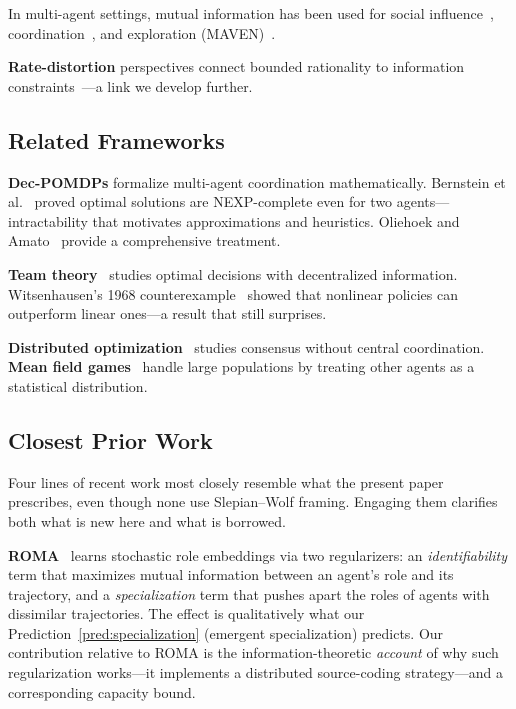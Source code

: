 \documentclass[10pt, letterpaper]{article}
\begin{document}
In multi-agent settings, mutual information has been used for social influence~\cite{jaques2019social}, coordination~\cite{wang2020roma}, and exploration (MAVEN)~\cite{mahajan2019maven}.

\textbf{Rate-distortion} perspectives connect bounded rationality to information constraints~\cite{ortega2013,genewein2015}---a link we develop further.

\subsection{Related Frameworks}

\textbf{Dec-POMDPs} formalize multi-agent coordination mathematically. Bernstein et al.~\cite{bernstein2002} proved optimal solutions are NEXP-complete even for two agents---intractability that motivates approximations and heuristics. Oliehoek and Amato~\cite{oliehoek2016} provide a comprehensive treatment.

\textbf{Team theory}~\cite{marschak1972} studies optimal decisions with decentralized information. Witsenhausen's 1968 counterexample~\cite{witsenhausen1968} showed that nonlinear policies can outperform linear ones---a result that still surprises.

\textbf{Distributed optimization}~\cite{boyd2011admm,nedic2009distributed} studies consensus without central coordination. \textbf{Mean field games}~\cite{huang2006meanfield} handle large populations by treating other agents as a statistical distribution.

\subsection{Closest Prior Work}
\label{sec:closest-work}

Four lines of recent work most closely resemble what the present paper prescribes, even though none use Slepian--Wolf framing. Engaging them clarifies both what is new here and what is borrowed.

\textbf{ROMA}~\cite{wang2020roma} learns stochastic role embeddings via two regularizers: an \emph{identifiability} term that maximizes mutual information between an agent's role and its trajectory, and a \emph{specialization} term that pushes apart the roles of agents with dissimilar trajectories. The effect is qualitatively what our Prediction~\ref{pred:specialization} (emergent specialization) predicts. Our contribution relative to ROMA is the information-theoretic \emph{account} of why such regularization works---it implements a distributed source-coding strategy---and a corresponding capacity bound.
\end{document}
